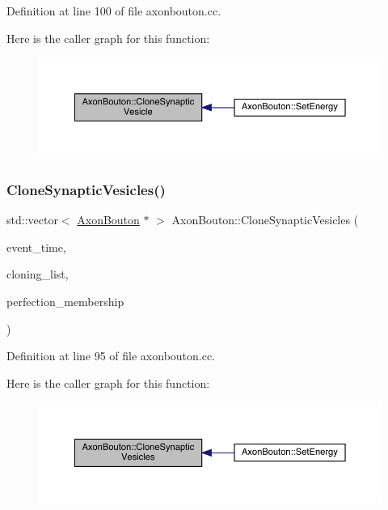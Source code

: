 Definition at line 100 of file axonbouton.\+cc.

Here is the caller graph for this function\+:\nopagebreak
\begin{figure}[H]
\begin{center}
\leavevmode
\includegraphics[width=350pt]{class_axon_bouton_a0e739b20447539f8db3655e83575fcf4_icgraph}
\end{center}
\end{figure}
\mbox{\label{class_axon_bouton_a7bf1d8db3287dc5357d0095233f5c47f}} 
\subsubsection{\texorpdfstring{Clone\+Synaptic\+Vesicles()}{CloneSynapticVesicles()}}
{\footnotesize\ttfamily std\+::vector$<$ \hyperlink{class_axon_bouton}{Axon\+Bouton} $\ast$ $>$ Axon\+Bouton\+::\+Clone\+Synaptic\+Vesicles (\begin{DoxyParamCaption}\item[{std\+::chrono\+::time\+\_\+point$<$ \hyperlink{universe_8h_a0ef8d951d1ca5ab3cfaf7ab4c7a6fd80}{Clock} $>$}]{event\+\_\+time,  }\item[{std\+::vector$<$ \hyperlink{class_axon_bouton}{Axon\+Bouton} $\ast$$>$}]{cloning\+\_\+list,  }\item[{double}]{perfection\+\_\+membership }\end{DoxyParamCaption})}



Definition at line 95 of file axonbouton.\+cc.

Here is the caller graph for this function\+:\nopagebreak
\begin{figure}[H]
\begin{center}
\leavevmode
\includegraphics[width=350pt]{class_axon_bouton_a7bf1d8db3287dc5357d0095233f5c47f_icgraph}
\end{center}
\end{figure}
\mbox{\label{class_axon_bouton_a2aa0abe381f6e7c87c702189d01dfbf2}} 

